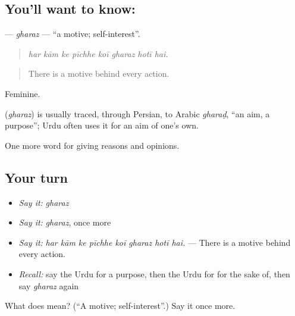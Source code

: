 \subsection*{You'll want to know: }
\textbf{} — \emph{gharaz} — \textquotedblleft{}a motive; self-interest\textquotedblright{}.

\begin{quote}
       
\end{quote}

\begin{quote}
\emph{har kām ke pīchhe koī gharaz hotī hai.}
\end{quote}

\begin{quote}
There is a motive behind every action.
\end{quote}

Feminine.

\begin{cousinweb}
\textbf{} (\emph{gharaz}) is usually traced, through Persian, to Arabic \emph{gharaḍ}, \textquotedblleft{}an aim, a purpose\textquotedblright{}; Urdu often uses it for an aim of one's own.
\end{cousinweb}

\begin{grammarlens}[title={What you've built}]
One more word for giving reasons and opinions.
\end{grammarlens}

\subsection*{Your turn}
\begin{itemize}
\raggedright
  \item \emph{Say it:} \emph{gharaz}
  \item \emph{Say it:} \emph{gharaz}, once more
  \item \emph{Say it:} \emph{har kām ke pīchhe koī gharaz hotī hai.} — There is a motive behind every action.
  \item \emph{Recall:} say the Urdu for a purpose, then the Urdu for for the sake of, then say \emph{gharaz} again
\end{itemize}

\begin{tcolorbox}[breakable,colback=teal!4,colframe=teal!35!black,title={Before you move on}]
What does  mean? (\textquotedblleft{}A motive; self-interest\textquotedblright{}.) Say it once more.
\end{tcolorbox}
